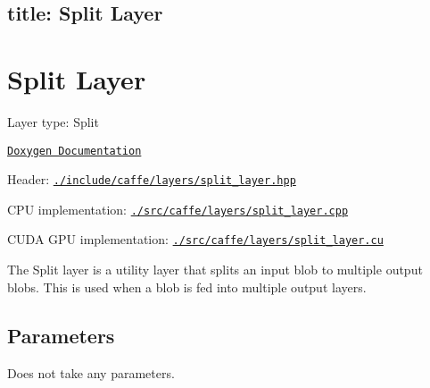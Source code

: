 

 \subsection*{title\+: Split Layer }

\section*{Split Layer}


\begin{DoxyItemize}
\item Layer type\+: {\ttfamily Split}
\item \href{http://caffe.berkeleyvision.org/doxygen/classcaffe_1_1SplitLayer.html}{\tt Doxygen Documentation}
\item Header\+: \href{https://github.com/BVLC/caffe/blob/master/include/caffe/layers/split_layer.hpp}{\tt {\ttfamily ./include/caffe/layers/split\+\_\+layer.hpp}}
\item C\+PU implementation\+: \href{https://github.com/BVLC/caffe/blob/master/src/caffe/layers/split_layer.cpp}{\tt {\ttfamily ./src/caffe/layers/split\+\_\+layer.cpp}}
\item C\+U\+DA G\+PU implementation\+: \href{https://github.com/BVLC/caffe/blob/master/src/caffe/layers/split_layer.cu}{\tt {\ttfamily ./src/caffe/layers/split\+\_\+layer.cu}}
\end{DoxyItemize}

The {\ttfamily Split} layer is a utility layer that splits an input blob to multiple output blobs. This is used when a blob is fed into multiple output layers.

\subsection*{Parameters}

Does not take any parameters. 